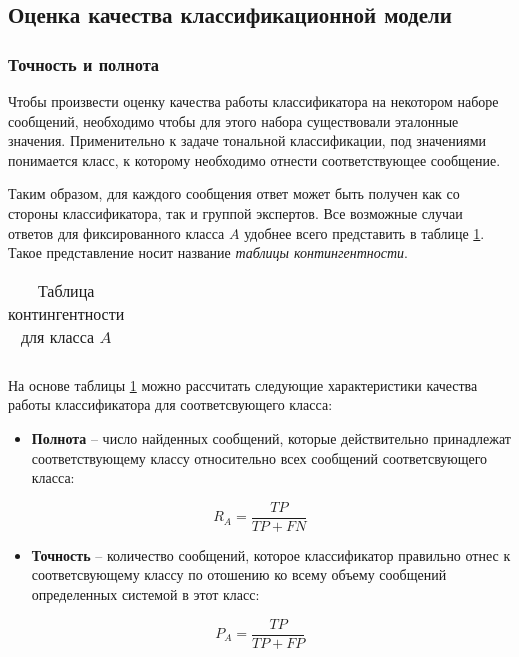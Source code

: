     \subsection{Оценка качества классификационной модели}

        \subsubsection{Точность и полнота}
    Чтобы произвести оценку качества работы классификатора на некотором наборе
    сообщений, необходимо чтобы для этого набора существовали эталонные
    значения. Применительно к задаче тональной классификации, под значениями
    понимается класс, к которому необходимо отнести соответствующее сообщение.

    Таким образом, для каждого сообщения ответ может быть получен как со стороны
    классификатора, так и группой экспертов. Все возможные случаи ответов
    для фиксированного класса $A$ удобнее всего представить в таблице
    \ref{table:contingent}. Такое представление носит название
    {\it таблицы контингентности}.

    \begin{table}[ht]
        \centering
        \caption{Таблица контингентности для класса $A$}
        \label{table:contingent}
        \begin{tabular}{|l|}
            \hline
             \\ \hline
         \end{tabular}
     \end{table}

     На основе таблицы \ref{table:contingent} можно рассчитать следующие
     характеристики качества работы классификатора для соответсвующего класса:
    \begin{itemize}
        \item {\bf Полнота} -- число найденных сообщений, которые
            действительно принадлежат соответствующему классу относительно всех
            сообщений соответсвующего класса:

            \begin{equation}
                \label{eq:recall}
                R_A = \dfrac{TP}{TP + FN} \hspace{20pt}
            \end{equation}

        \item {\bf Точность} -- количество сообщений, которое
            классификатор правильно отнес к соответсвующему классу по отошению
            ко всему объему сообщений определенных системой в этот класс:

            \begin{equation}
                \label{eq:precision}
                P_A = \dfrac{TP}{TP + FP} \hspace{20pt}
            \end{equation}
    \end{itemize}


